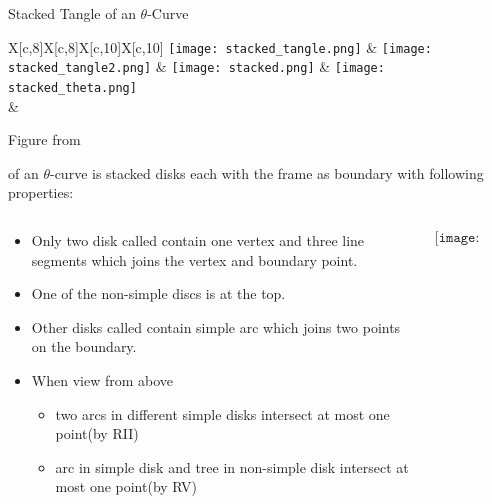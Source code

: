 \begin{frame}{Stacked Tangle of an $\theta$-Curve}
	\begin{tabu}{X[c,8]X[c,8]X[c,10]X[c,10]}
		\texttt{[image: stacked\_tangle.png]} & \texttt{[image: stacked\_tangle2.png]} & \texttt{[image: stacked.png]} & \texttt{[image: stacked\_theta.png]}\\
		 & 
	\end{tabu}
	\seprule
	\tiny{Figure from \cite{arc_kauffman}}
\end{frame}


\begin{frame}
	 of an $\theta$-curve is stacked disks each with the frame as boundary with following properties:
	\begin{columns}
		\begin{column}{0.8\textwidth}
			\begin{itemize}
				\item Only two disk called  contain one vertex and three line segments which joins the vertex and boundary point.
				\item One of the non-simple discs is at the top.
				\item Other disks called  contain simple arc which joins two points on the boundary.
				\item When view from above
				\begin{itemize}
					\item two arcs in different simple disks intersect at most one point(by RII)
					\item arc in simple disk and tree in non-simple disk intersect at most one point(by RV)
				\end{itemize}
			\end{itemize}
		\end{column}

		\begin{column}{0.2\textwidth}
			$$\texttt{[image: stacked.png]}$$
		\end{column}
	\end{columns}
\end{frame}


